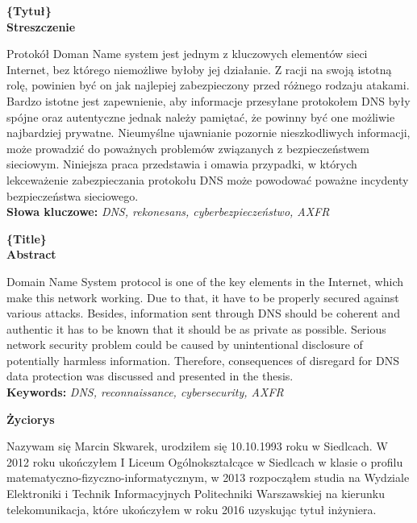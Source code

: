 \newpage

\clearpage
{}
\newpage
\clearpage
{}
\begin{center}
	\fontsize{18pt}{12pt}\selectfont\textbf{\{Tytuł\}}\\
	\vspace{1cm}
	\fontsize{14pt}{12pt}\selectfont
	\textbf{Streszczenie}
\end{center}
Protokół Doman Name system jest jednym z kluczowych elementów sieci Internet, bez którego niemożliwe byłoby jej działanie.
Z racji na swoją istotną rolę, powinien być on jak najlepiej zabezpieczony przed różnego rodzaju atakami. Bardzo istotne jest zapewnienie,
aby informacje przesyłane protokołem DNS były spójne oraz autentyczne jednak należy pamiętać, że powinny być one możliwie najbardziej
prywatne. Nieumyślne ujawnianie pozornie nieszkodliwych informacji, może prowadzić do poważnych problemów związanych z bezpieczeństwem
sieciowym. Niniejsza praca przedstawia i omawia przypadki, w których lekceważenie zabezpieczania protokołu DNS może powodować poważne
incydenty bezpieczeństwa sieciowego.\\
\noindent\textbf{Słowa kluczowe:} \textit{DNS, rekonesans, cyberbezpieczeństwo, AXFR}\\
\vspace{1.5cm}

\begin{center}
	\fontsize{18pt}{12pt}\selectfont\textbf{\{Title\}}\\
	\vspace{1cm}
	\fontsize{14pt}{12pt}\selectfont
	\textbf{Abstract}
\end{center}
Domain Name System protocol is one of the key elements in the Internet, which make this network working. Due to that, it have to be
properly secured against various attacks. Besides, information sent through DNS should be coherent and authentic it has to be
known that it should be as private as possible. Serious network security problem could be caused by unintentional disclosure of
potentially harmless information. Therefore, consequences of disregard for DNS data protection was discussed and presented in the thesis.
\\
\noindent\textbf{Keywords:} \textit{DNS, reconnaissance, cybersecurity, AXFR}\\
\vspace{1.5cm}

\newpage
\begin{center}
	\textbf{Życiorys}
\end{center}
\vspace{1cm}
Nazywam się Marcin Skwarek, urodziłem się 10.10.1993 roku w Siedlcach. W 2012 roku ukończyłem I Liceum Ogólnokształcące w Siedlcach
w klasie o profilu matematyczno-fizyczno-informatycznym, w 2013 rozpocząłem studia na Wydziale Elektroniki i Technik Informacyjnych
Politechniki Warszawskiej na kierunku telekomunikacja, które ukończyłem w roku 2016 uzyskując tytuł inżyniera.
